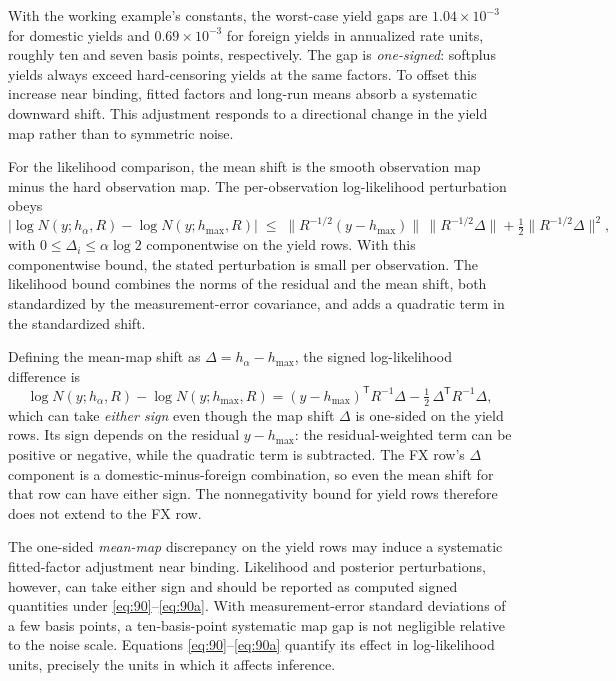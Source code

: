 \documentclass[11pt]{article}
\begin{document}
With the working example's constants, the worst-case yield gaps are
\(1.04\times10^{-3}\) for domestic yields and
\(0.69\times10^{-3}\) for foreign yields in annualized
rate units, roughly ten and seven basis points, respectively.
The gap is \emph{one-signed}: softplus yields always exceed
hard-censoring yields at the same factors. To offset this increase
near binding, fitted factors and long-run means absorb a systematic
downward shift. This adjustment responds to a directional change in
the yield map rather than to symmetric noise.

For the likelihood comparison, the mean shift is the smooth observation
map minus the hard observation map. The per-observation log-likelihood
perturbation obeys
\begin{equation}\label{eq:90}
 \bigl|\log N(y;h_\alpha,R)-\log N(y;h_{\max},R)\bigr|
 \;\leq\;
 \bigl\|R^{-1/2}(y-h_{\max})\bigr\|\,
 \bigl\|R^{-1/2}\Delta\bigr\|
 +\tfrac12\bigl\|R^{-1/2}\Delta\bigr\|^2,
\end{equation}
with \(0\le\Delta_i\le\alpha\log2\) componentwise on the yield
rows. With this componentwise bound, the stated perturbation is small
per observation. The likelihood bound combines the norms of the
residual and the mean shift, both standardized by the measurement-error
covariance, and adds a quadratic term in the standardized shift.

Defining the mean-map shift as
\(\Delta=h_\alpha-h_{\max}\), the signed log-likelihood
difference is
\begin{equation}\label{eq:90a}
 \log N(y;h_\alpha,R)-\log N(y;h_{\max},R)
 =(y-h_{\max})^{\mathsf T}R^{-1}\Delta
 -\tfrac12\,\Delta^{\mathsf T}R^{-1}\Delta,
\end{equation}
which can take \emph{either sign} even though the map shift
\(\Delta\) is one-sided on the yield rows.
Its sign depends on the residual
\(y-h_{\max}\): the residual-weighted term can be
positive or negative, while the quadratic term is subtracted.
The FX row's \(\Delta\) component is a
domestic-minus-foreign combination, so even the mean shift for that
row can have either sign. The nonnegativity bound for yield rows
therefore does not extend to the FX row.

The one-sided \emph{mean-map} discrepancy on the yield rows may induce
a systematic fitted-factor adjustment near binding. Likelihood and
posterior perturbations, however, can take either sign and should be
reported as computed signed quantities under
\eqref{eq:90}--\eqref{eq:90a}.
With measurement-error standard deviations of a few basis points,
a ten-basis-point systematic map gap is not negligible relative to
the noise scale. Equations
\eqref{eq:90}--\eqref{eq:90a}
quantify its effect in log-likelihood units, precisely the units in
which it affects inference.
\end{document}
